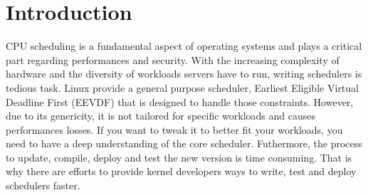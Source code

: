 \section{Introduction}

\par CPU scheduling is a fundamental aspect of operating systems and plays a critical part regarding performances and security. With the increasing complexity of hardware and the diversity of workloads servers have to run, writing schedulers is tedious task. Linux provide a general purpose scheduler, Earliest Eligible Virtual Deadline First (EEVDF) that is designed to handle those constraints. However, due to its genericity, it is not tailored for specific workloads and causes performances losses.  If you want to tweak it to better fit your workloads, you need to have a deep understanding of the core scheduler. Futhermore, the process to update, compile, deploy and test the new version is time consuming. That is why there are efforts to provide kernel developers ways to write, test and deploy schedulers faster. 
